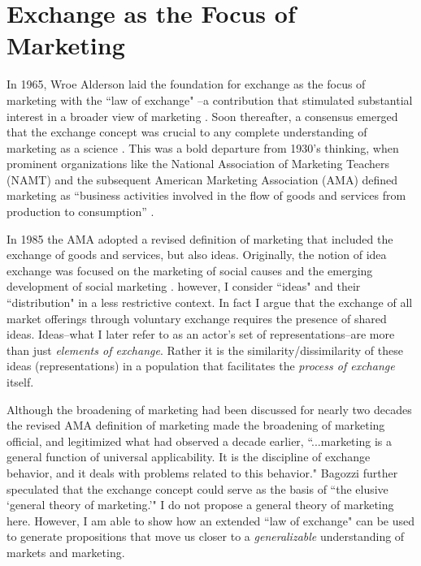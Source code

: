 \section{Exchange as the Focus of Marketing}
In 1965, Wroe Alderson laid the foundation for exchange as the focus of marketing with the ``law of exchange"  \citep{alderson1965a}--a contribution that stimulated substantial interest in a broader view of marketing \citep{kotler1969, kotler1972}.  Soon thereafter, a consensus emerged that the exchange concept was crucial to any complete understanding of marketing as a science \citep{bagozzi1974, bagozzi1975, houston1987}. This was a bold departure from 1930's thinking, when prominent organizations like the National Association of Marketing Teachers (NAMT) and the subsequent American Marketing Association (AMA) defined marketing as ``business activities involved in the flow of goods and services from production to consumption'' \citep{ama1937, lusch2007a}. 

In 1985 the AMA adopted a revised definition of marketing that included the exchange of goods and services, but also ideas. Originally, the notion of idea exchange was focused on the marketing of social causes and the emerging development of social marketing \citep{kotler1971}. however, I consider ``ideas" and their ``distribution" in a less restrictive context. In fact I argue that the exchange of all market offerings through voluntary exchange requires the presence of shared ideas. Ideas--what I later refer to as an actor's set of representations--are more than just \emph{elements of exchange}. Rather it is the similarity/dissimilarity of these ideas (representations) in a population that facilitates the \emph{process of exchange} itself. 

Although the broadening of marketing had been discussed for nearly two decades \citep{kotler1969} the revised AMA definition of marketing made the broadening of marketing official, and legitimized what \citep[p. 39]{bagozzi1974} had observed a decade earlier,  ``...marketing is a general function of universal applicability. It is the discipline of exchange behavior, and it deals with problems related to this behavior." Bagozzi further speculated that the exchange concept could serve as the basis of ``the elusive `general theory of marketing.'" I do not propose a general theory of marketing here. However, I am able to show how an extended ``law of exchange" can be used to generate propositions that move us closer to a \emph{generalizable} understanding of markets and marketing. 

